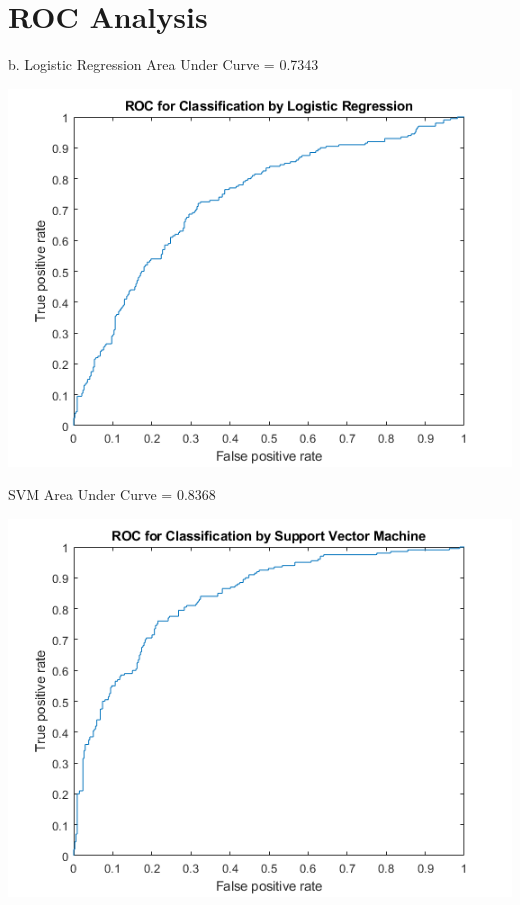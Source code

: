 \documentclass[a4paper]{article}
\begin{document}
\section{ROC Analysis}

b.
\newline\noindent
Logistic Regression Area Under Curve = 0.7343
\begin{center}
    \includegraphics[scale=1]{2b-log.png}
\end{center}

\newline\noindent
SVM Area Under Curve = 0.8368
\begin{center}
    \includegraphics[scale=1]{2b-svm.png}
\end{center}
\end{document}

